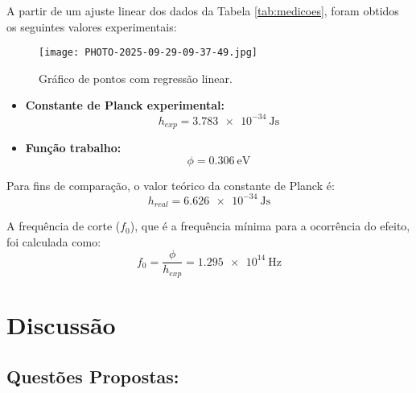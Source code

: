 \documentclass[conference]{IEEEtran}
\begin{document}
A partir de um ajuste linear dos dados da Tabela \ref{tab:medicoes}, foram obtidos os seguintes valores experimentais:

\begin{figure}[!htbp]
\centering
\texttt{[image: PHOTO-2025-09-29-09-37-49.jpg]}
\caption{Gráfico de pontos com regressão linear.}
\label{fig:placeholder}
\end{figure}

\begin{itemize}
\item \textbf{Constante de Planck experimental:}
\[ h_{exp} = \SI{3.783e-34}{\joule\second} \]
\item \textbf{Função trabalho:}
\[ \phi = \SI{0.306}{\electronvolt} \]
\end{itemize}

Para fins de comparação, o valor teórico da constante de Planck é:
\[ h_{real} = \SI{6.626e-34}{\joule\second} \]

A frequência de corte ($f_0$), que é a frequência mínima para a ocorrência do efeito, foi calculada como:
\[ f_0 = \frac{\phi}{h_{exp}} = \SI{1.295e14}{\hertz} \]

\section{Discussão}
\subsection{Questões Propostas:}
\end{document}
